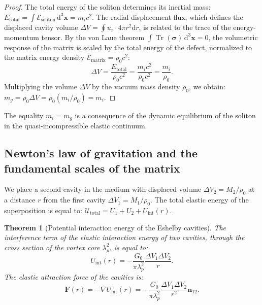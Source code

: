 \documentclass[11pt,a4paper]{article}
\newtheorem{theorem}{Theorem}
\theoremstyle{definition}
\theoremstyle{remark}
\begin{document}
\begin{proof}
The total energy of the soliton determines its inertial mass: $E_{\mathrm{total}} = \int \mathcal{E}_{\mathrm{soliton}} \, \mathrm{d}^3\mathbf{x} = m_i c^2$. The radial displacement flux, which defines the displaced cavity volume $\Delta V = \oint u_r \cdot 4\pi r^2 \mathrm{d}r$, is related to the trace of the energy-momentum tensor. By the von Laue theorem $\int \operatorname{Tr}(\boldsymbol{\sigma}) \, \mathrm{d}^3\mathbf{x} = 0$, the volumetric response of the matrix is scaled by the total energy of the defect, normalized to the matrix energy density $\mathcal{E}_{\mathrm{matrix}} = \rho_0 c^2$:
\begin{equation}
\Delta V = \frac{E_{\mathrm{total}}}{\rho_0 c^2} = \frac{m_i c^2}{\rho_0 c^2} = \frac{m_i}{\rho_0}.
\end{equation}
Multiplying the volume $\Delta V$ by the vacuum mass density $\rho_0$, we obtain: $m_g = \rho_0 \Delta V = \rho_0 (m_i / \rho_0) = m_i$.
\end{proof}
The equality $m_i = m_g$ is a consequence of the dynamic equilibrium of the soliton in the quasi-incompressible elastic continuum.

\subsection{Newton's law of gravitation and the fundamental scales of the matrix}

We place a second cavity in the medium with displaced volume $\Delta V_2 = M_2 / \rho_0$ at a distance $r$ from the first cavity $\Delta V_1 = M_1 / \rho_0$.
The total elastic energy of the superposition is equal to: $\mathcal{U}_{\mathrm{total}} = U_1 + U_2 + U_{\mathrm{int}}(r)$.

\begin{theorem}[Potential interaction energy of the Eshelby cavities]
\label{thm:eshelby_newton_force}
The interference term of the elastic interaction energy of two cavities, through the cross section of the vortex core $\lambda_p^2$, is equal to:
\begin{equation}
	U_{\mathrm{int}}(r) = -\frac{G_0}{\pi \lambda_p^2} \frac{\Delta V_1 \Delta V_2}{r}.
\label{eq:eshelby_potential_formula}
\end{equation}
The elastic attraction force of the cavities is:
\begin{equation}
	\mathbf{F}(r) = -\nabla U_{\mathrm{int}}(r) = -\frac{G_0}{\pi \lambda_p^2} \frac{\Delta V_1 \Delta V_2}{r^2} \mathbf{n}_{12}.
\label{eq:eshelby_force_formula}
\end{equation}
\end{theorem}
\end{document}
